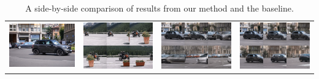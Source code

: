 \begin{table}[t]
\begin{tabular}{c|c|c|c}
        \includegraphics[width=0.23\linewidth]{media/car/ii.jpg}    & \includegraphics[width=0.23\linewidth]{media/car/dv.png}    & \includegraphics[width=0.23\linewidth]{media/car/vc.png}    & \includegraphics[width=0.23\linewidth]{media/car/ours.png}    \\
    \end{tabular}
    \caption{A side-by-side comparison of results from our method and the baseline.}
    \label{fig:results}
\end{table}
